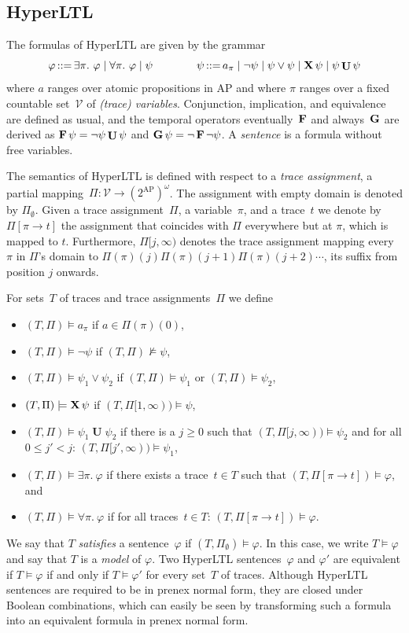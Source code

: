 \documentclass[dvipsnames,10pt,a4paper]{amsart}
\theoremstyle{definition}
\theoremstyle{remark}
\renewcommand{\phi}{\varphi}
\newcommand{\pow}[1]{2^{#1}}
\newcommand{\cceq}{\mathop{::=}}
\newcommand{\F}{\mathop{\mathbf{F}\vphantom{a}}\nolimits}
\newcommand{\G}{\mathop{\mathbf{G}\vphantom{a}}\nolimits}
\DeclareMathOperator{\U}{\mathbf{U}}
\newcommand{\X}{\mathop{\mathbf{X}\vphantom{a}}\nolimits}
\newcommand{\hyltl}{{HyperLTL}\xspace}
\newcommand{\suffix}[2]{#1[#2,\infty)}
\newcommand{\var}{\mathcal{V}}
\newcommand{\ap}[0]{\mathrm{AP}}
\renewcommand{\phi}{\varphi}
\begin{document}
\subsection{\hyltl}

The formulas of \hyltl are given by the grammar
\[
\phi  {} \cceq {}  \exists \pi.\ \phi \mid \forall \pi.\ \phi \mid \psi \qquad\qquad
\psi {}  \cceq {}  a_\pi \mid \neg \psi \mid \psi \vee \psi \mid \X \psi \mid \psi \U \psi
\]
where $a$ ranges over atomic propositions in $\ap$ and where $\pi$ ranges over a fixed countable set~$\var$ of \emph{(trace) variables}. Conjunction, implication, and equivalence are defined as usual, and the temporal operators eventually~$\F$ and always~$\G$ are derived as $\F\psi = \neg \psi\U \psi$ and $\G \psi = \neg \F \neg \psi$. A \emph{sentence} is a  formula without free variables.

The semantics of \hyltl is defined with respect to a \emph{trace assignment}, a partial mapping~$\Pi \colon \var \rightarrow (\pow{\ap})^\omega$. The assignment with empty domain is denoted by $\Pi_\emptyset$. Given a trace assignment~$\Pi$, a variable~$\pi$, and a trace~$t$ we denote by $\Pi[\pi \rightarrow t]$ the assignment that coincides with $\Pi$ everywhere but at $\pi$, which is mapped to $t$. 
Furthermore, $\suffix{\Pi}{j}$ denotes the trace assignment mapping every $\pi$ in $\Pi$'s domain to $\Pi(\pi)(j)\Pi(\pi)(j+1)\Pi(\pi)(j+2) \cdots $, its suffix from position $j$ onwards.

For sets~$T$ of traces and trace assignments~$\Pi$ we define 
\begin{itemize}
	\item $(T, \Pi) \models a_\pi$ if $a \in \Pi(\pi)(0)$,
	\item $(T, \Pi) \models \neg \psi$ if $(T, \Pi) \not\models \psi$,
	\item $(T, \Pi) \models \psi_1 \vee \psi_2 $ if $(T, \Pi) \models \psi_1$ or $(T, \Pi) \models \psi_2$,
	\item $(T, \Pi) \models \X \psi$ if $(T,\suffix{\Pi}{1}) \models \psi$,
	\item $(T, \Pi) \models \psi_1 \U \psi_2$ if there is a $j \ge 0$ such that $(T,\suffix{\Pi}{j}) \models \psi_2$ and for all $0 \le j' < j$: $(T,\suffix{\Pi}{j'}) \models \psi_1$, 
	\item $(T, \Pi) \models \exists \pi.\ \phi$ if there exists a trace~$t \in T$ such that $(T,\Pi[\pi \rightarrow t]) \models \phi$, and 
	\item $(T, \Pi) \models \forall \pi.\ \phi$ if for all traces~$t \in T$: $(T,\Pi[\pi \rightarrow t]) \models \phi$. 
\end{itemize}
We say that $T$ \emph{satisfies} a sentence~$\phi$ if $(T, \Pi_\emptyset) \models \phi$. In this case, we write $T \models \phi$ and say that $T$ is a \emph{model} of $\phi$. 
Two \hyltl sentences~$\varphi$ and $\varphi'$ are equivalent if $T \models \varphi$ if and only if $T \models \varphi'$ for every set~$T$ of traces.
Although \hyltl sentences are required to be in prenex normal form, they are closed under Boolean combinations, which can easily be seen by transforming such a formula into an equivalent formula in prenex normal form. 
\end{document}
